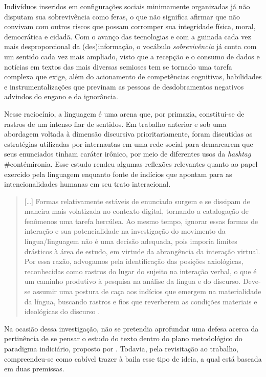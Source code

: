 \documentclass[portuguese]{textolivre}
\begin{document}
Indivíduos inseridos em configurações sociais minimamente organizadas já não disputam sua sobrevivência como feras, o que não significa afirmar que não convivam com outros riscos que possam corromper sua integridade física, moral, democrática e cidadã. Com o avanço das tecnologias e com a guinada cada vez mais desproporcional da (des)informação, o vocábulo \textit{sobrevivência} já conta com um sentido cada vez mais ampliado, visto que a recepção e o consumo de dados e notícias em textos das mais diversas semioses tem se tornado uma tarefa complexa que exige, além do acionamento de competências cognitivas, habilidades e instrumentalizações que previnam as pessoas de desdobramentos negativos advindos do engano e da ignorância.

Nesse raciocínio, a linguagem é uma arena que, por primazia, constitui-se de rastros de um intenso fiar de sentidos. Em trabalho anterior \cite{brambila2022contemironia} e sob uma abordagem voltada à dimensão discursiva prioritariamente, foram discutidas as estratégias utilizadas por internautas em uma rede social para demarcarem que seus enunciados tinham caráter irônico, por meio de diferentes usos da \textit{hashtag} \#contémironia. Esse estudo rendeu algumas reflexões relevantes quanto ao papel exercido pela linguagem enquanto fonte de indícios que apontam para as intencionalidades humanas em seu trato interacional.

\begin{quote}
    […] Formas relativamente estáveis de enunciado surgem e se dissipam de maneira mais volatizada no contexto digital, tornando a catalogação de fenômenos uma tarefa hercúlea. Ao mesmo tempo, ignorar essas formas de interação e sua potencialidade na investigação do movimento da língua/linguagem não é uma decisão adequada, pois imporia limites drásticos à área de estudo, em virtude da abrangência da interação virtual. Por essa razão, advogamos pela identificação das posições axiológicas, reconhecidas como rastros do lugar do sujeito na interação verbal, o que é um caminho produtivo à pesquisa na análise da língua e do discurso. Deve-se assumir uma postura de caça aos indícios que emergem na materialidade da língua, buscando rastros e fios que reverberem as condições materiais e ideológicas do discurso \cite[p. 25]{brambila2022contemironia}.
\end{quote}

Na ocasião dessa investigação, não se pretendia aprofundar uma defesa acerca da pertinência de se pensar o estudo do texto dentro do plano metodológico do paradigma indiciário, proposto por \textcite{ginzburg1986mitos,ginzburg2007fio}. Todavia, pela revisitação ao trabalho, compreendeu-se como cabível trazer à baila esse tipo de ideia, a qual está baseada em duas premissas.
\end{document}

